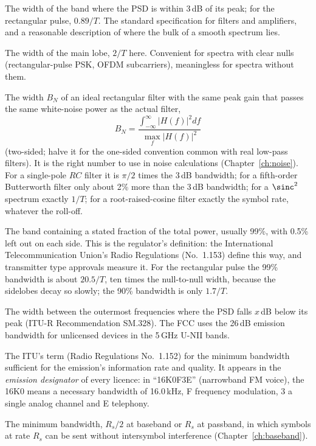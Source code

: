 \begin{description}[style=nextline,leftmargin=1.2em,font=\sffamily\bfseries\small\color{navy}]
\item[3\,dB (half-power) bandwidth.] The width of the band where the PSD is within 3\,dB of its peak;
for the rectangular pulse, $0.89/T$. The standard specification for filters and amplifiers, and a
reasonable description of where the bulk of a smooth spectrum lies.
\item[Null-to-null bandwidth.] The width of the main lobe, $2/T$ here. Convenient for spectra with
clear nulls (rectangular-pulse PSK, OFDM subcarriers), meaningless for spectra without them.
\item[Noise-equivalent bandwidth.] The width $B_N$ of an ideal rectangular filter with the same peak
gain that passes the same white-noise power as the actual filter,
\begin{equation}
B_N=\frac{\int_{-\infty}^{\infty}|H(f)|^2df}{\max_f|H(f)|^2}
\label{eq:ch02:noisebw}
\end{equation}
(two-sided; halve it for the one-sided convention common with real low-pass filters). It is the
right number to use in noise calculations (Chapter~\ref{ch:noise}). For a single-pole $RC$ filter
it is $\pi/2$ times the 3\,dB bandwidth; for a fifth-order Butterworth filter only about 2\% more
than the 3\,dB bandwidth; for a $\sinc^2$ spectrum exactly $1/T$; for a root-raised-cosine
filter exactly the symbol rate, whatever the roll-off.

\item[Fractional-power (occupied) bandwidth.] The band containing a stated fraction of the total
power, usually 99\%, with 0.5\% left out on each side. This is the regulator's definition: the
International Telecommunication Union's Radio Regulations (No.~1.153) define  this way, and transmitter type approvals measure it. For the rectangular pulse the 99\%
bandwidth is about $20.5/T$, ten times the null-to-null width, because the sidelobes decay so slowly;
the 90\% bandwidth is only $1.7/T$.
\item[$x$-dB bandwidth.] The width between the outermost frequencies where the PSD falls $x$\,dB
below its peak (ITU-R Recommendation SM.328). The FCC uses the 26\,dB emission bandwidth for
unlicensed devices in the 5\,GHz U-NII bands.
\item[Necessary bandwidth.] The ITU's term (Radio Regulations No.~1.152) for the minimum bandwidth
sufficient for the emission's information rate and quality. It appears in the
\emph{emission designator} of every licence: in ``16K0F3E'' (narrowband FM voice), the 16K0 means a
necessary bandwidth of 16.0\,kHz, F frequency modulation, 3 a single analog channel and E telephony.
\item[Nyquist bandwidth.] The minimum bandwidth, $R_s/2$ at baseband or $R_s$ at passband, in which
symbols at rate $R_s$ can be sent without intersymbol interference (Chapter~\ref{ch:baseband}).
\end{description}

